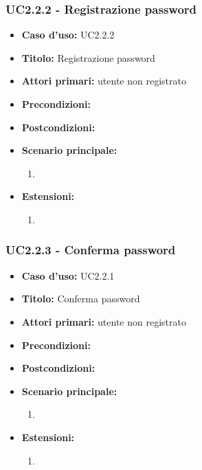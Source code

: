 \documentclass[casi-duso]{subfiles}
\begin{document}
\subsubsection{UC2.2.2 - Registrazione password}
\label{subsub:uc2.2.2utente}
\begin{itemize}
  \item \textbf{Caso d’uso:} UC2.2.2 
  \item \textbf{Titolo:} Registrazione password
  \item \textbf{Attori primari:} utente non registrato
  \item \textbf{Precondizioni:} 
  \item \textbf{Postcondizioni:}  
  \item \textbf{Scenario principale:} 
  \begin{enumerate}
    \item 
  \end{enumerate}
  \item \textbf{Estensioni:} 
  \begin{enumerate}
    \item 
  \end{enumerate}     
\end{itemize}

\subsubsection{UC2.2.3 - Conferma password}
\label{subsub:uc2.2.3utente}
\begin{itemize}
  \item \textbf{Caso d’uso:} UC2.2.1 
  \item \textbf{Titolo:} Conferma password
  \item \textbf{Attori primari:} utente non registrato
  \item \textbf{Precondizioni:} 
  \item \textbf{Postcondizioni:}  
  \item \textbf{Scenario principale:} 
  \begin{enumerate}
    \item 
  \end{enumerate}
  \item \textbf{Estensioni:} 
  \begin{enumerate}
    \item 
  \end{enumerate}     
\end{itemize}
\end{document}
